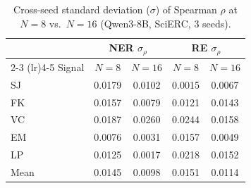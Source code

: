 \begin{table}[t]
\centering
\caption{Cross-seed standard deviation ($\sigma$) of Spearman $\rho$ at $N\!=\!8$ vs.\ $N\!=\!16$ (Qwen3-8B, SciERC, 3 seeds).}
\label{tab:sigma-comparison}
\small
\begin{tabular}{l cc cc}
\toprule
 & \multicolumn{2}{c}{\textbf{NER} $\sigma_\rho$} & \multicolumn{2}{c}{\textbf{RE} $\sigma_\rho$} \\
\cmidrule(lr){2-3} \cmidrule(lr){4-5}
Signal & $N\!=\!8$ & $N\!=\!16$ & $N\!=\!8$ & $N\!=\!16$ \\
\midrule
SJ & 0.0179 & 0.0102 & 0.0015 & 0.0067 \\
FK & 0.0157 & 0.0079 & 0.0121 & 0.0143 \\
VC & 0.0187 & 0.0260 & 0.0244 & 0.0158 \\
EM & 0.0076 & 0.0031 & 0.0157 & 0.0049 \\
LP & 0.0125 & 0.0017 & 0.0218 & 0.0152 \\
\midrule
Mean & 0.0145 & 0.0098 & 0.0151 & 0.0114 \\
\bottomrule
\end{tabular}
\end{table}

